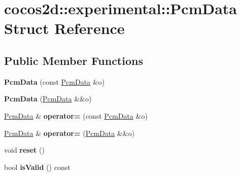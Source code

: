 \hypertarget{structcocos2d_1_1experimental_1_1PcmData}{}\section{cocos2d\+:\+:experimental\+:\+:Pcm\+Data Struct Reference}
\label{structcocos2d_1_1experimental_1_1PcmData}
\subsection*{Public Member Functions}
\begin{DoxyCompactItemize}
\item 
\mbox{\label{structcocos2d_1_1experimental_1_1PcmData_a95db7b03dab1d6c58d6d9b505c79e2d7}} 
{\bfseries Pcm\+Data} (const \hyperlink{structcocos2d_1_1experimental_1_1PcmData}{Pcm\+Data} \&o)
\item 
\mbox{\label{structcocos2d_1_1experimental_1_1PcmData_a1f9ccebd846779b5b4bdb662351b9ab3}} 
{\bfseries Pcm\+Data} (\hyperlink{structcocos2d_1_1experimental_1_1PcmData}{Pcm\+Data} \&\&o)
\item 
\mbox{\label{structcocos2d_1_1experimental_1_1PcmData_ae56580e4ab7cbdfd80b407424e01e6db}} 
\hyperlink{structcocos2d_1_1experimental_1_1PcmData}{Pcm\+Data} \& {\bfseries operator=} (const \hyperlink{structcocos2d_1_1experimental_1_1PcmData}{Pcm\+Data} \&o)
\item 
\mbox{\label{structcocos2d_1_1experimental_1_1PcmData_a27da080f9ca583a59968f6e9086e3668}} 
\hyperlink{structcocos2d_1_1experimental_1_1PcmData}{Pcm\+Data} \& {\bfseries operator=} (\hyperlink{structcocos2d_1_1experimental_1_1PcmData}{Pcm\+Data} \&\&o)
\item 
\mbox{\label{structcocos2d_1_1experimental_1_1PcmData_aa2aa3415ed476e4cfe6df148b618cb65}} 
void {\bfseries reset} ()
\item 
\mbox{\label{structcocos2d_1_1experimental_1_1PcmData_a22f238c972deeb4ab3d027d7c5e4e1bc}} 
bool {\bfseries is\+Valid} () const

\end{DoxyCompactItemize}
